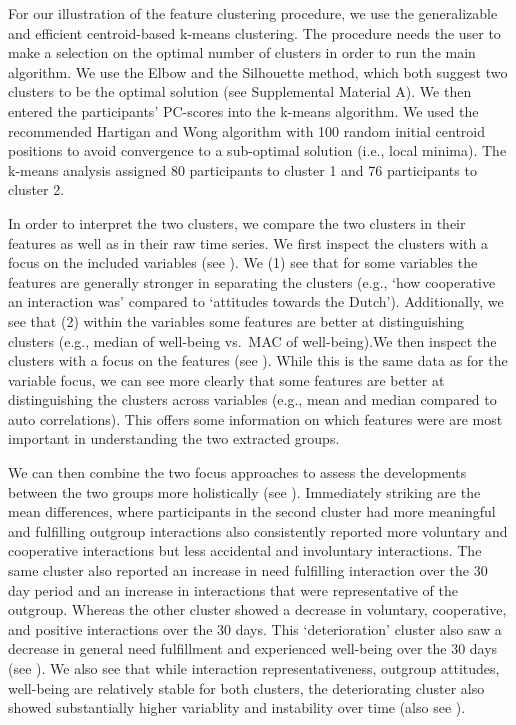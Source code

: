 For our illustration of the feature clustering procedure, we use the
generalizable and efficient centroid-based k-means clustering. The
procedure needs the user to make a selection on the optimal number of
clusters in order to run the main algorithm. We use the Elbow and the
Silhouette method, which both suggest two clusters to be the optimal
solution (see Supplemental Material A). We then entered the
participants' PC-scores into the k-means algorithm. We used the
recommended Hartigan and Wong algorithm \citep{hartigan1979} with 100
random initial centroid positions to avoid convergence to a sub-optimal
solution (i.e., local minima). The k-means analysis assigned 80
participants to cluster 1 and 76 participants to cluster 2.

In order to interpret the two clusters, we compare the two clusters in
their features as well as in their raw time series. We first inspect the
clusters with a focus on the included variables (see
). We (1) see that for some variables the
features are generally stronger in separating the clusters (e.g., `how
cooperative an interaction was' compared to `attitudes towards the
Dutch'). Additionally, we see that (2) within the variables some
features are better at distinguishing clusters (e.g., median of
well-being vs.~MAC of well-being).We then inspect the clusters with a
focus on the features (see ). While this
is the same data as for the variable focus, we can see more clearly that
some features are better at distinguishing the clusters across variables
(e.g., mean and median compared to auto correlations). This offers some
information on which features were are most important in understanding
the two extracted groups.

We can then combine the two focus approaches to assess the developments
between the two groups more holistically (see ).
Immediately striking are the mean differences, where participants in the
second cluster had more meaningful and fulfilling outgroup interactions
also consistently reported more voluntary and cooperative interactions
but less accidental and involuntary interactions. The same cluster also
reported an increase in need fulfilling interaction over the 30 day
period and an increase in interactions that were representative of the
outgroup. Whereas the other cluster showed a decrease in voluntary,
cooperative, and positive interactions over the 30 days. This
`deterioration' cluster also saw a decrease in general need fulfillment
and experienced well-being over the 30 days (see
). We also see that while interaction
representativeness, outgroup attitudes, well-being are relatively stable
for both clusters, the deteriorating cluster also showed substantially
higher variablity and instability over time (also see
).

